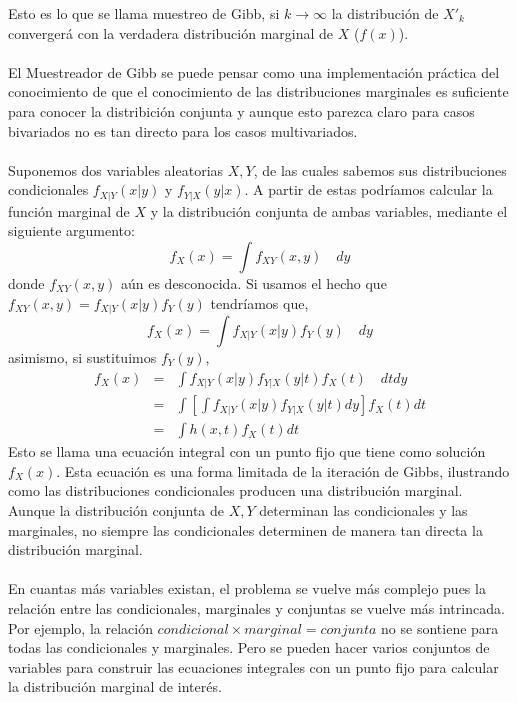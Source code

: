 Esto es lo que se llama muestreo de Gibb, si $k \rightarrow \infty$ la distribuci\'on de $X'_k$ converger\'a con la verdadera distribuci\'on marginal de $X$ ($f(x)$).\\
\\
El Muestreador de Gibb se puede pensar como una implementaci\'on pr\'actica del conocimiento de que el conocimiento de las distribuciones marginales es suficiente para conocer la distribici\'on conjunta y aunque esto parezca claro para casos bivariados no es tan directo para los casos multivariados.\\
\\
Suponemos dos variables aleatorias $X,Y$, de las cuales sabemos sus distribuciones condicionales $f_{X|Y}(x|y)$ y $f_{Y|X}(y|x)$. A partir de estas podr\'iamos calcular la funci\'on marginal de $X$ y la distribuci\'on conjunta de ambas variables, mediante  el siguiente argumento:\\
\[f_X(x)=\int f_{XY}(x,y)\quad dy\]
donde $f_{XY}(x,y)$ a\'un es desconocida. Si usamos el hecho que $f_{XY}(x,y)=f_{X|Y}(x|y)f_Y(y)$ tendr\'iamos que,\\
\[f_X(x)=\int f_{X|Y}(x|y)f_Y(y) \quad dy\]
asimismo, si sustituimos $f_Y(y)$,
\begin{eqnarray*}
f_X(x) &=& \int f_{X|Y}(x|y) f_{Y|X}(y|t) f_X(t) \quad dt dy\\
       &=& \int [ \int  f_{X|Y}(x|y)f_{Y|X}(y|t) dy]  f_X(t) dt\\
       &=& \int h(x,t) f_X(t) dt
\end{eqnarray*}
Esto se llama una ecuaci\'on integral con un punto fijo que tiene como soluci\'on $f_X(x)$. Esta ecuaci\'on es una forma limitada de la iteraci\'on de Gibbs, ilustrando como las distribuciones condicionales producen una distribuci\'on marginal. Aunque la distribuci\'on conjunta de $X,Y$ determinan las condicionales y las marginales, no siempre las condicionales determinen de manera tan directa la distribuci\'on marginal.\\
\\
En cuantas m\'as variables existan, el problema se vuelve m\'as complejo pues la relaci\'on entre las condicionales, marginales y conjuntas se vuelve m\'as intrincada. Por ejemplo, la relaci\'on $condicional \times marginal = conjunta$ no se sontiene para todas las condicionales y marginales. Pero se pueden hacer varios conjuntos de variables para construir las ecuaciones integrales con un punto fijo para calcular la distribuci\'on marginal de inter\'es.\\
